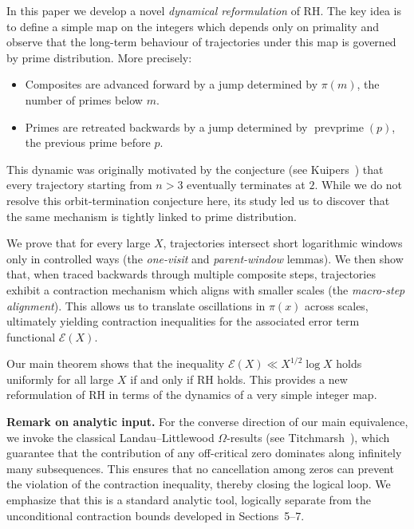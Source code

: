 \documentclass[11pt]{article}
\theoremstyle{plain}
\theoremstyle{definition}
\theoremstyle{remark}
\begin{document}
In this paper we develop a novel \emph{dynamical reformulation} of RH. The key idea is to define a simple map on the integers which depends only on primality and observe that the long-term behaviour of trajectories under this map is governed by prime distribution. More precisely:

\begin{itemize}
\item Composites are advanced forward by a jump determined by $\pi(m)$, the number of primes below $m$.
\item Primes are retreated backwards by a jump determined by $\operatorname{prevprime}(p)$, the previous prime before $p$.
\end{itemize}

This dynamic was originally motivated by the conjecture (see Kuipers~\cite{OEIS:A368196,OEIS:A368241,OEIS:A368690}) that every trajectory starting from $n>3$ eventually terminates at $2$. While we do not resolve this orbit-termination conjecture here, its study led us to discover that the same mechanism is tightly linked to prime distribution. 

We prove that for every large $X$, trajectories intersect short logarithmic windows only in controlled ways (the \emph{one-visit} and \emph{parent-window} lemmas). We then show that, when traced backwards through multiple composite steps, trajectories exhibit a contraction mechanism which aligns with smaller scales (the \emph{macro-step alignment}). This allows us to translate oscillations in $\pi(x)$ across scales, ultimately yielding contraction inequalities for the associated error term functional $\mathcal E(X)$. 

Our main theorem shows that the inequality $\mathcal E(X)\ll X^{1/2}\log X$ holds uniformly for all large $X$ if and only if RH holds. This provides a new reformulation of RH in terms of the dynamics of a very simple integer map. 

\medskip
\noindent
\textbf{Remark on analytic input.}
For the converse direction of our main equivalence, we invoke the classical 
Landau--Littlewood $\Omega$-results (see Titchmarsh~\cite[§14.25]{Titchmarsh}), 
which guarantee that the contribution of any off-critical zero dominates along 
infinitely many subsequences. This ensures that no cancellation among zeros can 
prevent the violation of the contraction inequality, thereby closing the logical loop. 
We emphasize that this is a standard analytic tool, logically separate from the 
unconditional contraction bounds developed in Sections~5--7.
\end{document}
